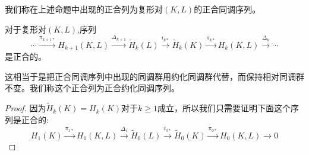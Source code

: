  \begin{definition}
 我们称在上述命题中出现的正合列为复形对$(K,L)$的正合同调序列。
 \end{definition}
 
  


\begin{proposition}\label{chap3_pro_233}
对于复形对$(K,L)$,序列
 $$\cdots \xrightarrow{\pi_{k+1*}} H_{k+1}(K,L)\xrightarrow{\Delta_{k+1}}\tilde{H}_{k}(L)\xrightarrow{i_{k*}}\tilde{H}_{k}(K)\xrightarrow{\pi_{k*}}H_{k}(K,L)\xrightarrow{\Delta_{k}}\cdots$$是正合的。
\end{proposition}
\begin{remark}
这相当于是把正合同调序列中出现的同调群用约化同调群代替，而保持相对同调群不变。我们称这个正合列为正合约化同调序列。
\end{remark}
\begin{proof}
因为$\tilde{H}_{k}(K)=H_{k}(K)$对于$k\geq 1$成立，所以我们只需要证明下面这个序列是正合的:
\begin{equation*}
    H_{1}(K)\xrightarrow{\pi_{1*}}H_{1}(K,L)\xrightarrow{\Delta_{1}}\tilde{H}_{0}(L)\xrightarrow{i_{0*}}\tilde{H}_{0}(K)\xrightarrow{\pi_{0*}}H_{0}(K,L)\rightarrow 0
\end{equation*}


\end{proof}
